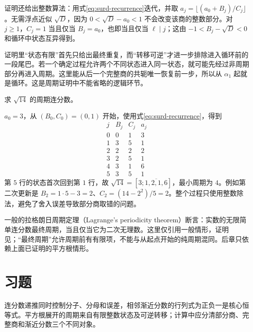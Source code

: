 \documentclass[UTF8,12pt,a4paper,fontset=fandol]{ctexbook}
\begin{document}
证明还给出整数算法：用式\eqref{eq:surd-recurrence}迭代，并取 $a_j=\lfloor(a_0+B_j)/C_j\rfloor$。无需浮点近似 $\sqrt D$，因为 $0<\sqrt D-a_0<1$ 不会改变该商的整数部分。对 $j\ge1$，$C_j=1$ 当且仅当 $B_j=a_0$，也即当且仅当 $\ell\mid j$；这由 $-1<B_j-\sqrt D<0$ 和循环中状态互异得到。

证明里“状态有限”首先只给出最终重复，而“转移可逆”才进一步排除进入循环前的一段尾巴。若一个确定过程允许两个不同状态进入同一状态，就可能先经过非周期部分再进入周期。这里能从后一个完整商的共轭唯一恢复前一步，所以从 $\alpha_1$ 起就是循环。这是周期证明中不能省略的逻辑环节。

\begin{example}[平方根展开的整数计算表]
求 $\sqrt{14}$ 的周期连分数。
\end{example}
\begin{solve}
$a_0=3$，从 $(B_0,C_0)=(0,1)$ 开始，使用式\eqref{eq:surd-recurrence}，得到
\[
\begin{array}{c|r|r|r}
j&B_j&C_j&a_j\\\hline
0&0&1&3\\
1&3&5&1\\
2&2&2&2\\
3&2&5&1\\
4&3&1&6\\
5&3&5&1
\end{array}
\]
第 $5$ 行的状态首次回到第 $1$ 行，故 $\sqrt{14}=[3;\overline{1,2,1,6}]$，最小周期为 $4$。例如第二次更新是 $B_2=1\cdot5-3=2$、$C_2=(14-2^2)/5=2$。整个过程只使用整数除法，避免了舍入误差导致部分商取错的问题。
\end{solve}

一般的拉格朗日周期定理（Lagrange's periodicity theorem）断言：实数的无限简单连分数最终周期，当且仅当它为二次无理数。这里仅引用一般情形，证明见\cite{mit-periodic}；“最终周期”允许周期前有有限项，不能与从起点开始的纯周期混同。后章只依赖上面已证明的平方根情形。

\section{习题}

连分数递推同时控制分子、分母和误差，相邻渐近分数的行列式为正负一是核心恒等式。平方根展开的周期来自有限整数状态及可逆转移；计算中应分清部分商、完整商和渐近分数三个不同对象。
\end{document}

